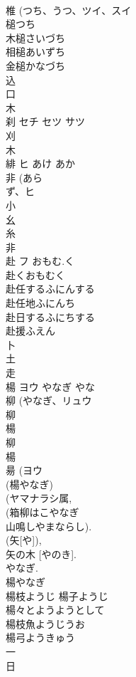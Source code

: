 \documentclass[8pt]{extreport}
\begin{document}
\begin{CJK}{UTF8}{min}
\\	椎 (つち、うつ、ツイ、スイ 
\\	槌つち 
\\	木槌さいづち 
\\	相槌あいずち 
\\	金槌かなづち 
\\	込 
\\	口 
\\	木 
\\	刹	セチ セツ サツ		
\\	刈 
\\	木 
\\	緋	ヒ	あけ あか	
\\	非 (あら
\\	ず、ヒ 
\\	小 
\\	幺 
\\	糸 
\\	非 
\\	赴	フ	おもむ.く	
\\	赴くおもむく 
\\	赴任するふにんする 
\\	赴任地ふにんち 
\\	赴日するふにちする 
\\	赴援ふえん 
\\	卜 
\\	土 
\\	走 
\\	楊	ヨウ	やなぎ やな	
\\	柳 (やなぎ、リュウ 
\\	柳 
\\	楊 
\\	柳 
\\	楊 
\\	昜 (ヨウ 
\\	(楊やなぎ) 
\\	(ヤマナラシ属, 
\\	(箱柳はこやなぎ 
\\	山鳴しやまならし). 
\\	(矢[や]), 
\\	矢の木 [やのき]. 
\\	やなぎ. 
\\	楊やなぎ 
\\	楊枝ようじ 楊子ようじ 
\\	楊々とようようとして 
\\	楊枝魚ようじうお 
\\	楊弓ようきゅう 
\\	一 
\\	日 

\end{CJK}
\end{document}
